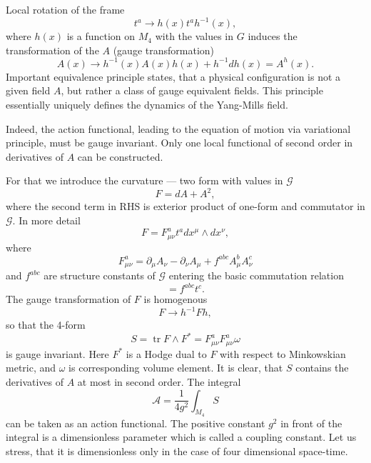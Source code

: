 \documentclass[12pt]{article}
\DeclareMathOperator{\tr}{tr}
\newcommand{\MM}{M}
\newcommand{\GG}{G}
\newcommand{\pr} {\partial}
\newcommand{\AAA}{\mathcal{A}}
\newcommand{\JJ} {\mathcal{G}}
\begin{document}
	Local rotation of the frame
\begin{equation*}
        t^{a} \to h(x) t^{a} h^{-1}(x) ,
\end{equation*}
	where
    $ h(x) $
	is a function on
    $ \MM_{4} $
	with the values in
    $ \GG $
	induces the transformation of the
    $ A $
	(gauge transformation)
\begin{equation*}
        A(x) \to h^{-1}(x) A(x) h(x) + h^{-1} dh(x) = A^{h}(x) .
\end{equation*}
	Important equivalence principle states, that a physical
	configuration is not a given field
    $ A $,
	but rather a class of gauge equivalent fields. This principle
	essentially uniquely defines the dynamics of the
	Yang-Mills field.

	Indeed, the action functional, leading to the equation of motion via
	variational principle, must be gauge invariant. Only one local
	functional of second order in derivatives of
    $ A $
	can be constructed.

	For that we introduce the curvature --- two form with values in
    $ \JJ $
\begin{equation*}
	F = d A + A^{2} ,
\end{equation*}
	where the second term in RHS is exterior product of one-form
	and commutator in
    $ \JJ $.
	In more detail
\begin{equation*}
        F = F^{a}_{\mu\nu} t^{a} dx^{\mu} \wedge dx^{\nu} ,
\end{equation*}
	where
\begin{equation*}
        F^{a}_{\mu\nu} = \pr_{\mu} A_{\nu} - \pr_{\nu} A_{\mu} +
		f^{abc} A^{b}_{\mu} A^{c}_{\nu}
\end{equation*}
	and
    $ f^{abc} $
	are structure constants of
    $ \JJ $
	entering the basic commutation relation
\begin{equation*}
        [ t^{a} , t^{b} ] = f^{abc} t^{c} .
\end{equation*}
	The gauge transformation of
    $ F $
	is homogenous
\begin{equation*}
        F \to h^{-1} F h ,
\end{equation*}
	so that the 4-form
\begin{equation*}
        S = \tr F \wedge F^{*} = F^{a}_{\mu\nu} F^{a}_{\mu\nu} \omega
\end{equation*}
	is gauge invariant. Here
    $ F^{*} $
	is a Hodge dual to
    $ F $
	with respect to Minkowskian metric, and
    $ \omega $
	is corresponding volume element. It is clear, that
    $ S $
	contains the derivatives of
    $ A $
	at most in second order. The integral
\begin{equation}
\label{AC}
        \AAA = \frac{1}{4 g^{2}} \int_{\MM_{4}} S
\end{equation}
	can be taken as an action functional. The positive constant
    $ g^{2} $
	in front of the integral is a dimensionless parameter which
	is called a coupling constant. Let us stress, that it is
	dimensionless only in the case of four dimensional space-time.
\end{document}
